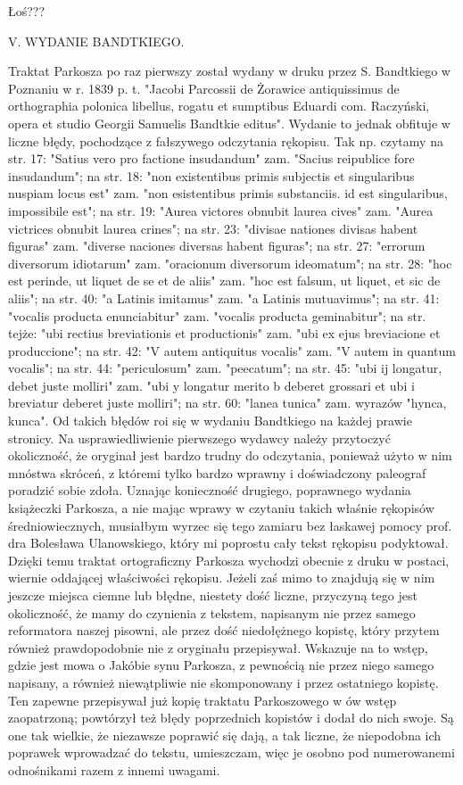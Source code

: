 Łoś???

V. WYDANIE BANDTKIEGO.



Traktat Parkosza po raz pierwszy został wydany w druku przez S. Bandtkiego w Poznaniu w r. 1839 p. t. "Jacobi Parcossii de Żorawice antiquissimus de orthographia polonica libellus, rogatu et sumptibus Eduardi com. Raczyński, opera et studio Georgii Samuelis Bandtkie editus". Wydanie to jednak obfituje w liczne błędy, pochodzące z fałszywego odczytania rękopisu. Tak np. czytamy na str. 17: "Satius vero pro factione insudandum" zam. "Sacius reipublice fore insudandum"; na str. 18: "non existentibus primis subjectis et singularibus nuspiam locus est" zam. "non esistentibus primis substanciis. id est singularibus, impossibile est"; na str. 19: "Aurea victores obnubit laurea cives" zam. "Aurea victrices obnubit laurea crines"; na str. 23: "divisae nationes divisas habent figuras" zam. "diverse naciones diversas habent figuras"; na str. 27: "errorum diversorum idiotarum" zam. "oracionum diversorum ideomatum"; na str. 28: "hoc est perinde, ut liquet de se et de aliis" zam. "hoc est falsum, ut liquet, et sic de aliis"; na str. 40: "a Latinis imitamus" zam. "a Latinis mutuavimus"; na str. 41: "vocalis producta enunciabitur" zam. "vocalis producta geminabitur"; na str. tejże: "ubi rectius breviationis et productionis" zam. "ubi ex ejus breviacione et produccione"; na str. 42: "V autem antiquitus vocalis" zam. "V autem in quantum vocalis"; na str. 44: "periculosum" zam. "peecatum"; na str. 45: "ubi ij longatur, debet juste molliri" zam. "ubi y longatur merito b deberet grossari et ubi i breviatur deberet juste molliri"; na str. 60: "lanea tunica" zam. wyrazów "hynca, kunca". Od takich błędów roi się w wydaniu Bandtkiego na każdej prawie stronicy. Na usprawiedliwienie pierwszego wydawcy należy przytoczyć okoliczność, że oryginał jest bardzo trudny do odczytania, ponieważ użyto w nim mnóstwa skróceń, z któremi tylko bardzo wprawny i doświadczony paleograf poradzić sobie zdoła. Uznając konieczność drugiego, poprawnego wydania książeczki Parkosza, a nie mając wprawy w czytaniu takich właśnie rękopisów średniowiecznych, musiałbym wyrzec się tego zamiaru bez łaskawej pomocy prof. dra Bolesława Ulanowskiego, który mi poprostu cały tekst rękopisu podyktował. Dzięki temu traktat ortograficzny Parkosza wychodzi obecnie z druku w postaci, wiernie oddającej właściwości rękopisu. Jeżeli zaś mimo to znajdują się w nim jeszcze miejsca ciemne lub błędne, niestety dość liczne, przyczyną tego jest okoliczność, że mamy do czynienia z tekstem, napisanym nie przez samego reformatora naszej pisowni, ale przez dość niedołężnego kopistę, który przytem również prawdopodobnie nie z oryginału przepisywał. Wskazuje na to wstęp, gdzie jest mowa o Jakóbie synu Parkosza, z pewnością nie przez niego samego napisany, a również niewątpliwie nie skomponowany i przez ostatniego kopistę. Ten zapewne przepisywał już kopię traktatu Parkoszowego w ów wstęp zaopatrzoną; powtórzył też błędy poprzednich kopistów i dodał do nich swoje. Są one tak wielkie, że niezawsze poprawić się dają, a tak liczne, że niepodobna ich poprawek wprowadzać do tekstu, umieszczam, więc je osobno pod numerowanemi odnośnikami razem z innemi uwagami.

